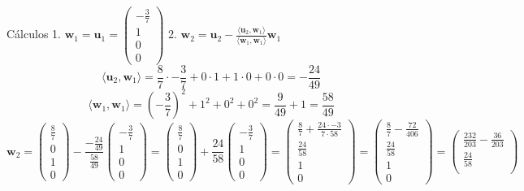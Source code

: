 {{{Cálculos
1. \(\mathbf{w}_1 = \mathbf{u}_1 = \begin{pmatrix}
-\frac{3}{7} \\
1 \\
0 \\
0
\end{pmatrix}\)
2. \(\mathbf{w}_2 = \mathbf{u}_2 - \frac{\langle \mathbf{u}_2, \mathbf{w}_1 \rangle}{\langle \mathbf{w}_1, \mathbf{w}_1 \rangle} \mathbf{w}_1\)
\[
\langle \mathbf{u}_2, \mathbf{w}_1 \rangle = \frac{8}{7} \cdot -\frac{3}{7} + 0 \cdot 1 + 1 \cdot 0 + 0 \cdot 0 = -\frac{24}{49}
\]
\[
\langle \mathbf{w}_1, \mathbf{w}_1 \rangle = \left( -\frac{3}{7} \right)^2 + 1^2 + 0^2 + 0^2 = \frac{9}{49} + 1 = \frac{58}{49}
\]
\[
\mathbf{w}_2 = \begin{pmatrix}
\frac{8}{7} \\
0 \\
1 \\
0
\end{pmatrix} - \frac{-\frac{24}{49}}{\frac{58}{49}} \begin{pmatrix}
-\frac{3}{7} \\
1 \\
0 \\
0
\end{pmatrix}
= \begin{pmatrix}
\frac{8}{7} \\
0 \\
1 \\
0
\end{pmatrix} + \frac{24}{58} \begin{pmatrix}
-\frac{3}{7} \\
1 \\
0 \\
0
\end{pmatrix}
= \begin{pmatrix}
\frac{8}{7} + \frac{24 \cdot -3}{7 \cdot 58} \\
\frac{24}{58} \\
1 \\
0
\end{pmatrix}
= \begin{pmatrix}
\frac{8}{7} - \frac{72}{406} \\
\frac{24}{58} \\
1 \\
0
\end{pmatrix}
= \begin{pmatrix}
\frac{232}{203} - \frac{36}{203} \\
\frac{24}{58} \\

\end{pmatrix}\]}}}
